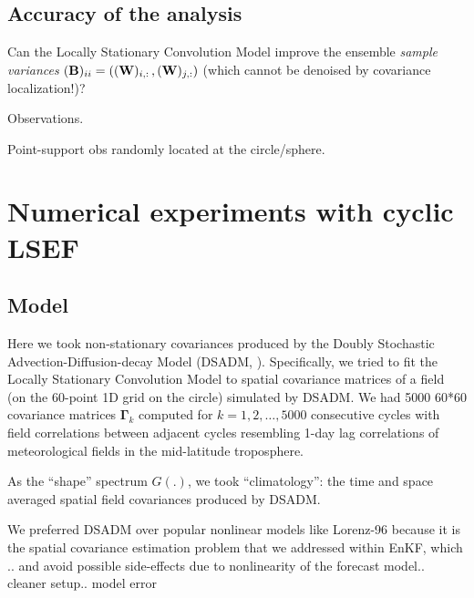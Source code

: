 \documentclass[12pt]{article}
\begin{document}
\subsection {Accuracy of the analysis}
\label{sec_expm_anls}








Can the Locally Stationary Convolution Model improve the ensemble {\em sample variances} 
$({\bf B})_{ii} = (({\bf W})_{i,:} \,, ({\bf W})_{j,:})$ 
(which cannot be denoised by 
covariance localization!)?




Observations.

Point-support obs randomly located at the circle/sphere.





\section{Numerical experiments with cyclic LSEF}
\label{sec_num_NCEF}






\subsection{Model}
\label{sec_num_mdl}




Here we took non-stationary covariances produced by the Doubly Stochastic
Advection-Diffusion-decay Model (DSADM, \citet{DSADM}). 
Specifically, we tried to fit the Locally Stationary Convolution Model to spatial covariance matrices of a 
field (on the 60-point 1D grid on the circle) simulated by DSADM.
We had 5000 60*60 covariance matrices $\boldsymbol\Gamma_k$ computed for $k=1,2,\dots,5000$ consecutive cycles
with field correlations between adjacent cycles resembling 1-day lag correlations 
of meteorological fields in the mid-latitude troposphere. 

As the ``shape'' spectrum $G(.)$, we took ``climatology'': the time and space averaged 
spatial field covariances produced by DSADM.



We preferred DSADM over popular nonlinear models like Lorenz-96 \citep{Lorenz1998}
because it is the spatial covariance estimation problem that we addressed within EnKF,
which ..
and avoid possible side-effects due to nonlinearity of the forecast model..
cleaner setup.. model error
\end{document}
